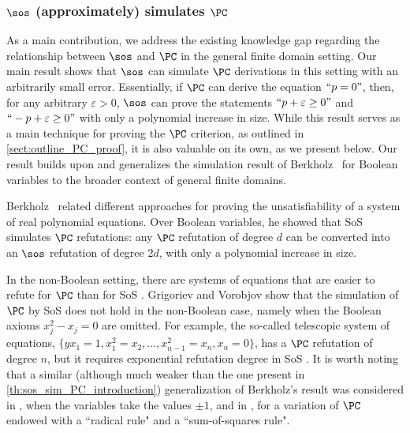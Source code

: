 \documentclass[11pt]{article}
\begin{document}
\subsubsection*{$\sos$ (approximately) simulates $\PC$}\label{sect:PC_criterion_introduction}

As a main contribution, we address the existing knowledge gap regarding the relationship between $\sos$ and $\PC$ in the general finite domain setting.
Our main result shows that $\sos$ can simulate $\PC$ derivations in this setting with an arbitrarily small error. Essentially, if $\PC$ can derive the equation $``p=0"$, then, for any arbitrary $\varepsilon>0$, $\sos$ can prove the statements $``p+\varepsilon\geq 0"$ and $``-p+\varepsilon \geq 0"$ with only a polynomial increase in size.
While this result serves as a main technique for proving the $\PC$ criterion, as outlined in \cref{sect:outline_PC_proof}, it is also valuable on its own, as we present below.
Our result builds upon and generalizes the simulation result of Berkholz~\cite{berkholz18} for Boolean variables to the broader context of general finite domains.

Berkholz~\cite{berkholz18} related different approaches for proving the unsatisfiability of a system of real polynomial equations. Over Boolean variables, he showed that SoS simulates $\PC$ refutations: any \(\PC\) refutation of degree \(d\) can be converted into an \(\sos\) refutation of degree \(2d\), with only a polynomial increase in size.

In the non-Boolean setting, there are systems of equations that are easier to refute for $\PC$ than for SoS \cite{GrigorievV01}. Grigoriev and Vorobjov \cite{GrigorievV01} show that the simulation of $\PC$ by SoS does not hold in the non-Boolean case, namely when the Boolean axioms $x_j^2-x_j=0$ are omitted. For example, the so-called telescopic system of equations, $\{ yx_1=1, x_1^2=x_2, \ldots, x_{n-1}^2=x_n, x_n=0\}$, has a $\PC$ refutation of degree $n$, but it requires exponential refutation degree in SoS \cite{GrigorievV01}. It is worth noting that a similar (although much weaker than the one present in \cref{th:sos_sim_PC_introduction}) generalization of Berkholz's result was considered in \cite{Sokolov20}, when the variables take the values $\pm 1$, and in \cite{PartFTT21}, for a variation of $\PC$ endowed with a ``radical rule" and a ``sum-of-squares rule".
\end{document}
